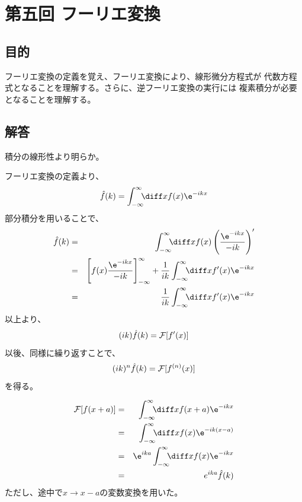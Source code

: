\section{第五回 フーリエ変換}

\subsection{目的}
フーリエ変換の定義を覚え、フーリエ変換により、線形微分方程式が
代数方程式となることを理解する。さらに、逆フーリエ変換の実行には
複素積分が必要となることを理解する。

\subsection{解答}

積分の線形性より明らか。

フーリエ変換の定義より、
\begin{equation}
  \hat{f}(k) = \int_{-\infty}^{\infty} \!\!\! \diff x f(x) \e^{-ikx}
\end{equation}
部分積分を用いることで、
\begin{eqnarray}
  \hat{f}(k) &=& \int_{-\infty}^{\infty} \!\!\! \diff x f(x) \left( \frac{\e^{-ikx}}{-ik}\right)'\\
  &=&
  \left[
    f(x)  \frac{\e^{-ikx}}{-ik}
    \right]_{-\infty}^{\infty}
  + \frac{1}{ik}\int_{-\infty}^{\infty} \!\!\! \diff x f'(x) \e^{-ikx}\\
  &=& \frac{1}{ik}\int_{-\infty}^{\infty} \!\!\! \diff x f'(x) \e^{-ikx}
\end{eqnarray}
以上より、
\begin{equation}
  (ik) \hat{f}(k) = {\cal F}[f'(x)]
\end{equation}
以後、同様に繰り返すことで、
\begin{equation}
  (ik)^n \hat{f}(k) = {\cal F}[f^{(n)}(x)]
\end{equation}
を得る。

\begin{eqnarray}
  {\cal F}[f(x+a)] &=& \int_{-\infty}^{\infty} \!\!\! \diff x f(x+a) \e^{-ikx}\\
  &=& \int_{-\infty}^{\infty} \!\!\! \diff x f(x) \e^{-ik(x-a)}\\
  &=& \e^{ika} \int_{-\infty}^{\infty} \!\!\! \diff x f(x) \e^{-ikx}\\
  &=& e^{ika} \hat{f}(k)
\end{eqnarray}
ただし、途中で$x \rightarrow x-a$の変数変換を用いた。

